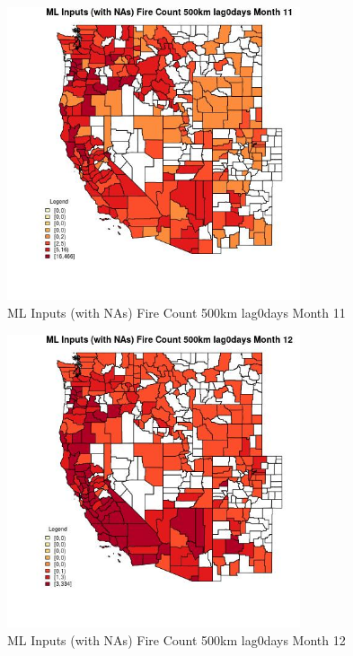 \begin{figure} 
\centering  
\includegraphics[width=0.77\textwidth]{Code_Outputs/Report_ML_input_PM25_Step4_part_e_de_duplicated_aves_compiled_2019-05-21wNAs_CountyFire_Count_500km_lag0daysmedianMonth11.jpg} 
\caption{\label{fig:Report_ML_input_PM25_Step4_part_e_de_duplicated_aves_compiled_2019-05-21wNAsCountyFire_Count_500km_lag0daysmedianMonth11}ML Inputs (with NAs) Fire Count 500km lag0days Month 11} 
\end{figure} 
 

\begin{figure} 
\centering  
\includegraphics[width=0.77\textwidth]{Code_Outputs/Report_ML_input_PM25_Step4_part_e_de_duplicated_aves_compiled_2019-05-21wNAs_CountyFire_Count_500km_lag0daysmedianMonth12.jpg} 
\caption{\label{fig:Report_ML_input_PM25_Step4_part_e_de_duplicated_aves_compiled_2019-05-21wNAsCountyFire_Count_500km_lag0daysmedianMonth12}ML Inputs (with NAs) Fire Count 500km lag0days Month 12} 
\end{figure} 
 

